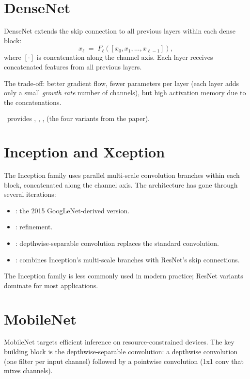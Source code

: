 \section{DenseNet}
\label{sec:vision_cnn:densenet}

DenseNet \cite{huang_densenet_2017} extends the skip connection
to all previous layers within each dense block:
\[
x_\ell \;=\; F_\ell([x_0, x_1, \ldots, x_{\ell-1}]),
\]
where $[\cdot]$ is concatenation along the channel axis. Each
layer receives concatenated features from all previous layers.

The trade-off: better gradient flow, fewer parameters per layer
(each layer adds only a small \emph{growth rate} number of
channels), but high activation memory due to the
concatenations.

\Lucid\ provides , ,
,  (the four variants
from the paper).

\section{Inception and Xception}
\label{sec:vision_cnn:inception}

The Inception family uses parallel multi-scale convolution
branches within each block, concatenated along the channel
axis. The architecture has gone through several iterations:

\begin{itemize}
  \item {}: the 2015 GoogLeNet-derived version.
  \item {}: refinement.
  \item {}: depthwise-separable convolution
    replaces the standard convolution.
  \item {}: combines Inception's
    multi-scale branches with ResNet's skip connections.
\end{itemize}

The Inception family is less commonly used in modern practice;
ResNet variants dominate for most applications.

\section{MobileNet}
\label{sec:vision_cnn:mobilenet}

MobileNet \cite{howard_mobilenet_2017} targets efficient
inference on resource-constrained devices. The key building
block is the depthwise-separable convolution: a depthwise
convolution (one filter per input channel) followed by a
pointwise convolution (1x1 conv that mixes channels).

